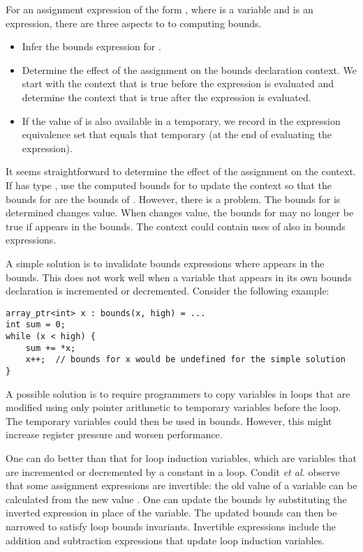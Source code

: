 For an assignment expression of the form  \code{=} ,
where  is a variable and  is an expression, there are
three aspects to to computing bounds. 
\begin{itemize}
\item Infer the bounds expression for .
\item Determine the effect of the assignment on the
bounds declaration context.
We start with the context that is true before the expression
is evaluated and determine the context that is true after
the expression is evaluated.
\item If the value of  is also available in a temporary,
we record in the expression equivalence set that  equals that
temporary (at the end of evaluating the expression).
\end{itemize}
It seems straightforward to determine the effect of the assignment
on the context.   If  has type
\arrayptr, use the computed bounds for  to update the context
so that the bounds for  are the bounds of .
However, there is a problem. The bounds for  is determined
  changes value. When  changes value, the bounds
for  may no longer be true if  appears in the bounds.
The context could contain uses of  also in bounds expressions.

A simple solution is to invalidate bounds expressions where  appears in
the bounds. This does not work well when a variable that appears in its
own bounds declaration is incremented or decremented. Consider the
following example:
\begin{lstlisting}
array_ptr<int> x : bounds(x, high) = ...
int sum = 0;
while (x < high) {
    sum += *x;
    x++;  // bounds for x would be undefined for the simple solution
}
\end{lstlisting}

A possible solution is to require programmers to copy variables in loops
that are modified using only pointer arithmetic to temporary variables
before the loop. The temporary variables could then be used in bounds.
However, this might increase register pressure and worsen performance.

One can do better than that for loop induction variables, which are
variables that are incremented or decremented by a constant in a loop.
Condit \textit{et al.} observe that some assignment expressions are
invertible: the old value of a variable can be calculated from the new
value . One can update the bounds by substituting the inverted
expression in place of the variable. The updated bounds can then be
narrowed to satisfy loop bounds invariants. Invertible expressions
include the addition and subtraction expressions that update loop
induction variables.

